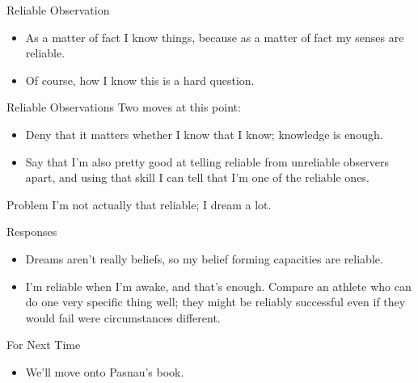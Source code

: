 \documentclass[
  17pt,
  letterpaper,
  ignorenonframetext,
  aspectratio=169,
  handout]{beamer}
\providecommand{\tightlist}{%
  \setlength{\itemsep}{0pt}\setlength{\parskip}{0pt}}\usepackage{longtable,booktabs,array}
\begin{document}
\begin{frame}{Reliable Observation}
\protect\hypertarget{reliable-observation}{}
\begin{itemize}[<+->]
\tightlist
\item
  As a matter of fact I know things, because as a matter of fact my
  senses are reliable.
\item
  Of course, how I know this is a hard question.
\end{itemize}
\end{frame}

\begin{frame}{Reliable Observations}
\protect\hypertarget{reliable-observations}{}
Two moves at this point:

\begin{itemize}[<+->]
\tightlist
\item
  Deny that it matters whether I know that I know; knowledge is enough.
\item
  Say that I'm also pretty good at telling reliable from unreliable
  observers apart, and using that skill I can tell that I'm one of the
  reliable ones.
\end{itemize}
\end{frame}

\begin{frame}{Problem}
\protect\hypertarget{problem}{}
I'm not actually that reliable; I dream a lot.
\end{frame}

\begin{frame}{Responses}
\protect\hypertarget{responses}{}
\begin{itemize}[<+->]
\tightlist
\item
  Dreams aren't really beliefs, so my belief forming capacities are
  reliable.
\item
  I'm reliable when I'm awake, and that's enough. Compare an athlete who
  can do one very specific thing well; they might be reliably successful
  even if they would fail were circumstances different.
\end{itemize}
\end{frame}

\begin{frame}{For Next Time}
\protect\hypertarget{for-next-time}{}
\begin{itemize}[<+->]
\tightlist
\item
  We'll move onto Pasnau's book.
\end{itemize}
\end{frame}
\end{document}
